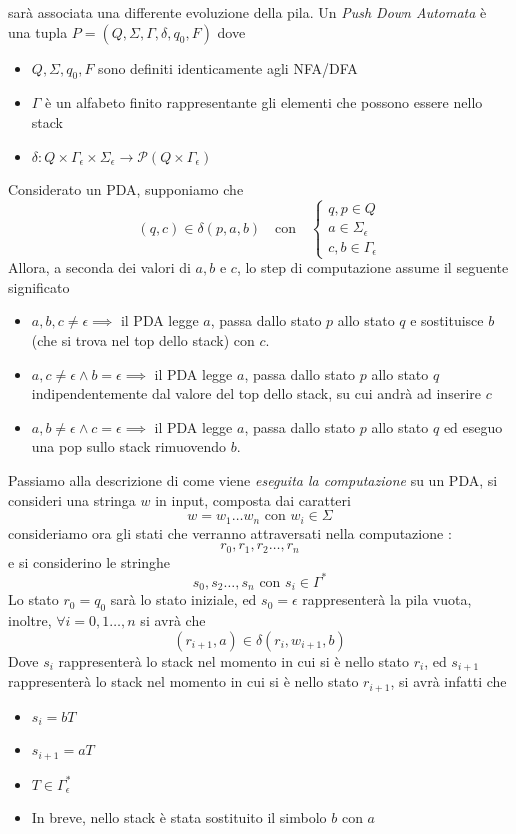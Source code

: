 \documentclass[10pt, letterpaper]{report}
\begin{document}
sarà associata una differente evoluzione della pila.\acc 
{} Un \textit{Push Down Automata} è una tupla $P=(Q,\Sigma,\Gamma,\delta,q_0,F)$ dove \begin{itemize}
    \item $Q,\Sigma,q_0,F$ sono definiti identicamente agli NFA/DFA 
    \item $\Gamma$ è un alfabeto finito rappresentante gli elementi che possono essere nello stack 
    \item $\delta : Q\times\Gamma_\epsilon\times\Sigma_\epsilon\rightarrow\mathcal{P}(Q\times\Gamma_\epsilon)$
\end{itemize}
Considerato un PDA, supponiamo che 
$$ (q,c)\in\delta(p,a,b) \ \ \ \text{ con } \ \ \  
\begin{cases}
    q,p\in Q \\ a\in \Sigma_\epsilon \\ c,b \in \Gamma_\epsilon
\end{cases} $$
Allora, a seconda dei valori di $a,b$ e $c$, lo step di computazione assume il seguente significato\begin{itemize}
    \item $a,b,c\ne\epsilon\implies$ il PDA legge $a$, passa dallo stato $p$ allo stato $q$ e sostituisce 
    $b$ (che si trova nel top dello stack) con $c$. 
    \item $a,c\ne\epsilon\land b=\epsilon\implies $ il PDA legge $a$, passa dallo stato $p$ allo stato $q$ 
    indipendentemente dal valore del top dello stack, su cui andrà ad inserire $c$ 
    \item $a,b\ne\epsilon\land c=\epsilon\implies $ il PDA legge $a$, passa dallo stato $p$ allo stato $q$ ed 
    eseguo una pop sullo stack rimuovendo $b$.
\end{itemize}
Passiamo alla descrizione di come viene \textit{eseguita la computazione} su un PDA, si consideri una stringa $w$ in input, 
composta dai caratteri $$w=w_1\dots w_n \text{ con } w_i\in\Sigma$$ consideriamo ora gli stati che 
verranno attraversati nella computazione : $$r_0,r_1,r_2\dots, r_{n}$$
e si considerino le stringhe 
$$ s_0,s_2\dots, s_n \text{ con } s_i\in\Gamma^*$$
Lo stato $r_0=q_0$ sarà lo stato iniziale, ed $s_0=\epsilon$ rappresenterà la pila vuota, inoltre, 
$\forall i = 0,1\dots, n$ si avrà che  
$$ (r_{i+1},a)\in\delta(r_i,w_{i+1},b)$$
Dove $s_i$ rappresenterà lo stack nel momento in cui si è nello stato $r_i$, ed $s_{i+1}$
rappresenterà lo stack nel momento in cui si è nello stato $r_{i+1}$, si avrà infatti che \begin{itemize}
    \item $s_i = bT$ 
    \item $s_{i+1}= aT$ 
    \item $T\in \Gamma_\epsilon^*$
    \item In breve, nello stack è stata sostituito il simbolo $b$ con $a$
\end{itemize}
\end{document}
